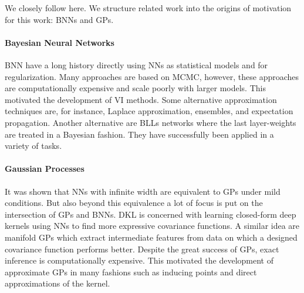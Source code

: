 We closely follow\cite{watsonLatentDerivativeBayesian2021} here.
We structure related work into the origins of motivation for this work: \aclp{BNN} and \aclp{GP}.

\paragraph{Bayesian Neural Networks}
\acl{BNN} have a long history directly using \acp{NN} as statistical models\cite{mackayPracticalBayesianFramework1992} and for regularization\cite{hintonKeepingNeuralNetworks1993}.
Many approaches are based on \ac{MCMC}\cite{andrieuIntroductionMCMCMachine2003,hoffmanNoUTurnSamplerAdaptively2014,chenStochasticGradientHamiltonian2014}, however, these approaches are computationally expensive and scale poorly with larger models.
This motivated the development of \ac{VI} methods\cite{hintonKeepingNeuralNetworks1993,petersonExplorationsMeanField1989,gravesPracticalVariationalInference2011}.
Some alternative approximation techniques are, for instance, Laplace approximation\cite{mackayPracticalBayesianFramework1992,denkerTransformingNeuralNetOutput1990,ritterScalableLaplaceApproximation2018}, ensembles\cite{lakshminarayananSimpleScalablePredictive2017,osbandRandomizedPriorFunctions2018,barberEnsembleLearningBayesian1998,pearceUncertaintyNeuralNetworks2020}, and expectation propagation\cite{hernandez-lobatoProbabilisticBackpropagationScalable2015}.
Another alternative are \acp{BLL} networks where the last layer-weights are treated in a Bayesian fashion\cite{lazaro-gredillaMarginalizedNeuralNetwork2010}.
They have successfully been applied in a variety of tasks\cite{snoekScalableBayesianOptimization2015,weberOptimizingBayesianLast2018,riquelmeDeepBayesianBandits2018,pinslerBayesianBatchActive2019,odonoghueUncertaintyBellmanEquation2018,oberBenchmarkingNeuralLinear2019}.


\paragraph{Gaussian Processes}
It was shown that \acp{NN} with infinite width are equivalent to \acp{GP} under mild conditions\cite{nealBayesianLearningNeural2012}.
But also beyond this equivalence a lot of focus is put on the intersection of \acp{GP} and \acp{BNN}.
\ac{DKL}\cite{wilsonDeepKernelLearning2016} is concerned with learning closed-form deep kernels using \acp{NN} to find more expressive covariance functions.
A similar idea are manifold \acp{GP}\cite{calandraManifoldGaussianProcesses2016} which extract intermediate features from data on which a designed covariance function performs better.
Despite the great success of \acp{GP}, exact inference is computationally expensive.
This motivated the development of approximate \acp{GP} in many fashions such as inducing points and direct approximations of the kernel\cite{nystromUberPraktischeAuflosung1930,rahimiRandomFeaturesLargeScale2007}.
